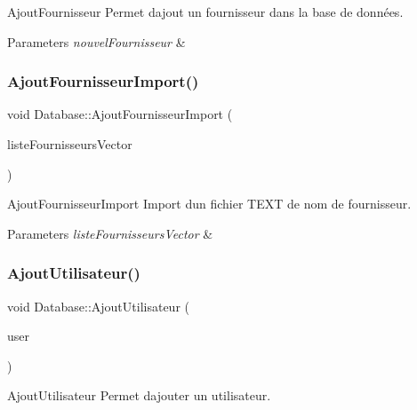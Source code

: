 Ajout\+Fournisseur Permet d\textquotesingle{}ajout un fournisseur dans la base de données. 


\begin{DoxyParams}{Parameters}
{\em nouvel\+Fournisseur} & \\
\hline
\end{DoxyParams}
\mbox{\label{class_database_af2ff34b4ea218f17f13045c3b303f5d1}} 
\subsubsection{\texorpdfstring{Ajout\+Fournisseur\+Import()}{AjoutFournisseurImport()}}
{\footnotesize\ttfamily void Database\+::\+Ajout\+Fournisseur\+Import (\begin{DoxyParamCaption}\item[{Q\+Vector$<$ Q\+String $>$}]{liste\+Fournisseurs\+Vector }\end{DoxyParamCaption})}



Ajout\+Fournisseur\+Import Import d\textquotesingle{}un fichier T\+E\+XT de nom de fournisseur. 


\begin{DoxyParams}{Parameters}
{\em liste\+Fournisseurs\+Vector} & \\
\hline
\end{DoxyParams}
\mbox{\label{class_database_ac9215994d89323fa31b0abdb98ab5463}} 
\subsubsection{\texorpdfstring{Ajout\+Utilisateur()}{AjoutUtilisateur()}}
{\footnotesize\ttfamily void Database\+::\+Ajout\+Utilisateur (\begin{DoxyParamCaption}\item[{\mbox{\hyperlink{class_utilisateur}{Utilisateur}} \&}]{user }\end{DoxyParamCaption})}



Ajout\+Utilisateur Permet d\textquotesingle{}ajouter un utilisateur. 


